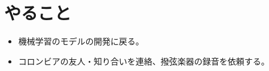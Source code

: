 \documentclass[a4paper, 11pt]{article}
\begin{document}


\section*{やること}
\begin{itemize}
    \item 機械学習のモデルの開発に戻る。
    \item コロンビアの友人・知り合いを連絡、撥弦楽器の録音を依頼する。
\end{itemize}



\end{document}
